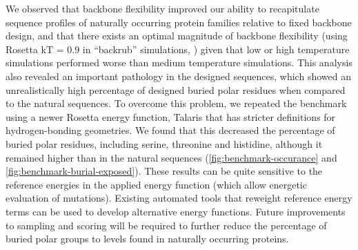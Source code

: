 We observed that backbone flexibility improved our ability to recapitulate sequence profiles of naturally occurring protein families relative to fixed backbone design, and that there exists an optimal magnitude of backbone flexibility (using Rosetta kT = 0.9 in ``backrub'' simulations, \cite{ollikainen_computational_2013}) given that low or high temperature simulations performed worse than medium temperature simulations. This analysis also revealed an important pathology in the designed sequences, which showed an unrealistically high percentage of designed buried polar residues when compared to the natural sequences. To overcome this problem, we repeated the benchmark using a newer Rosetta energy function, Talaris \cite{omeara_combined_2015} that has stricter definitions for hydrogen-bonding geometries. We found that this decreased the percentage of buried polar residues, including serine, threonine and histidine, although it remained higher than in the natural sequences (\cref{fig:benchmark-occurance} and \cref{fig:benchmark-burial-exposed}). These results can be quite sensitive to the reference energies in the applied energy function (which allow energetic evaluation of mutations). Existing automated tools \cite{leaver-fay_chapter_2013} that reweight reference energy terms can be used to develop alternative energy functions. Future improvements to sampling and scoring will be required to further reduce the percentage of buried polar groups to levels found in naturally occurring proteins.

